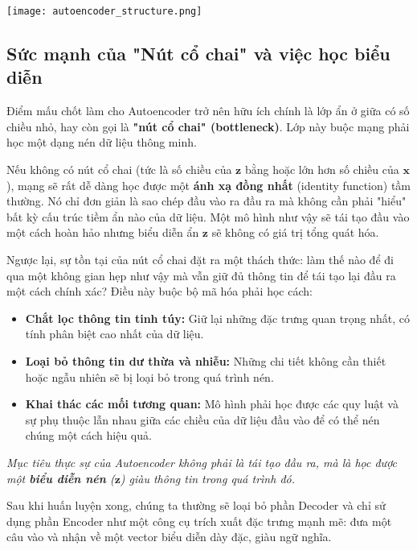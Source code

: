 \begin{center}
\texttt{[image: autoencoder\_structure.png]}
\label{fig:autoencoder_structure}
\end{center}

\subsection{Sức mạnh của "Nút cổ chai" và việc học biểu diễn}
Điểm mấu chốt làm cho Autoencoder trở nên hữu ích chính là lớp ẩn ở giữa có số chiều nhỏ, hay còn gọi là \textbf{"nút cổ chai" (bottleneck)}. Lớp này buộc mạng phải học một dạng nén dữ liệu thông minh.

Nếu không có nút cổ chai (tức là số chiều của $\mathbf{z}$ bằng hoặc lớn hơn số chiều của $\mathbf{x}$), mạng sẽ rất dễ dàng học được một \textbf{ánh xạ đồng nhất} (identity function) tầm thường. Nó chỉ đơn giản là sao chép đầu vào ra đầu ra mà không cần phải "hiểu" bất kỳ cấu trúc tiềm ẩn nào của dữ liệu. Một mô hình như vậy sẽ tái tạo đầu vào một cách hoàn hảo nhưng biểu diễn ẩn $\mathbf{z}$ sẽ không có giá trị tổng quát hóa.

Ngược lại, sự tồn tại của nút cổ chai đặt ra một thách thức: làm thế nào để đi qua một không gian hẹp như vậy mà vẫn giữ đủ thông tin để tái tạo lại đầu ra một cách chính xác? Điều này buộc bộ mã hóa phải học cách:
\begin{itemize}
    \item \textbf{Chắt lọc thông tin tinh túy:} Giữ lại những đặc trưng quan trọng nhất, có tính phân biệt cao nhất của dữ liệu.
    \item \textbf{Loại bỏ thông tin dư thừa và nhiễu:} Những chi tiết không cần thiết hoặc ngẫu nhiên sẽ bị loại bỏ trong quá trình nén.
    \item \textbf{Khai thác các mối tương quan:} Mô hình phải học được các quy luật và sự phụ thuộc lẫn nhau giữa các chiều của dữ liệu đầu vào để có thể nén chúng một cách hiệu quả.
\end{itemize}

\begin{displayquote}
    \textit{Mục tiêu thực sự của Autoencoder không phải là tái tạo đầu ra, mà là học được một \textbf{biểu diễn nén} ($\mathbf{z}$) giàu thông tin trong quá trình đó.}
\end{displayquote}

Sau khi huấn luyện xong, chúng ta thường sẽ loại bỏ phần Decoder và chỉ sử dụng phần Encoder như một công cụ trích xuất đặc trưng mạnh mẽ: đưa một câu vào và nhận về một vector biểu diễn dày đặc, giàu ngữ nghĩa.


